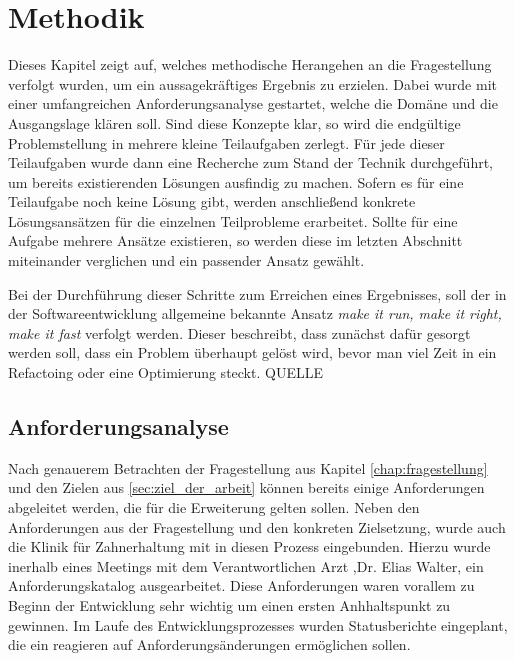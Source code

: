 \chapter{Methodik}
\label{chap:methodik} Dieses Kapitel zeigt auf, welches methodische Herangehen
an die Fragestellung verfolgt wurden, um ein aussagekräftiges Ergebnis zu erzielen.
Dabei wurde mit einer umfangreichen Anforderungsanalyse gestartet, welche die Domäne
und die Ausgangslage klären soll. Sind diese Konzepte klar, so wird die endgültige
Problemstellung in mehrere kleine Teilaufgaben zerlegt. Für jede dieser
Teilaufgaben wurde dann eine Recherche zum Stand der Technik durchgeführt, um bereits
existierenden Lösungen ausfindig zu machen. Sofern es für eine Teilaufgabe noch
keine Lösung gibt, werden anschließend konkrete Lösungsansätzen für die einzelnen
Teilprobleme erarbeitet. Sollte für eine Aufgabe mehrere Ansätze existieren, so werden
diese im letzten Abschnitt miteinander verglichen und ein passender Ansatz gewählt.

Bei der Durchführung dieser Schritte zum Erreichen eines Ergebnisses, soll der
in der Softwareentwicklung allgemeine bekannte Ansatz \textit{make it run, make it
right, make it fast} verfolgt werden. Dieser beschreibt, dass zunächst dafür gesorgt
werden soll, dass ein Problem überhaupt gelöst wird, bevor man viel Zeit in ein Refactoing
oder eine Optimierung steckt. QUELLE

\section{Anforderungsanalyse}
\label{sec:anforderungsanalyse} Nach genauerem Betrachten der Fragestellung aus Kapitel
\ref{chap:fragestellung} und den Zielen aus \ref{sec:ziel_der_arbeit} können bereits
einige Anforderungen abgeleitet werden, die für die Erweiterung gelten sollen. Neben
den Anforderungen aus der Fragestellung und den konkreten Zielsetzung, wurde
auch die Klinik für Zahnerhaltung mit in diesen Prozess eingebunden. Hierzu wurde
inerhalb eines Meetings mit dem Verantwortlichen Arzt ,Dr. Elias Walter, ein
Anforderungskatalog ausgearbeitet. Diese Anforderungen waren vorallem zu Beginn der
Entwicklung sehr wichtig um einen ersten Anhhaltspunkt zu gewinnen. Im Laufe des
Entwicklungsprozesses wurden Statusberichte eingeplant, die ein reagieren auf Anforderungsänderungen
ermöglichen sollen.

